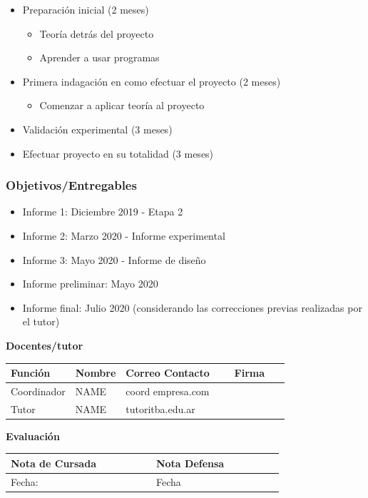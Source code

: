 \documentclass{article}
\newcommand{\reemplazo}[1]{{\color{red} #1}}
\begin{document}
\begin{itemize} \color{red} %
	\item Preparación inicial (2 meses)
	\begin{itemize}
		\item Teoría detrás del proyecto
		\item Aprender a usar programas
	\end{itemize}
	\item Primera indagación en como efectuar el proyecto (2 meses)
	\begin{itemize}
		\item Comenzar a aplicar teoría al proyecto
	\end{itemize}
	\item Validación experimental (3 meses)
	\item Efectuar proyecto en su totalidad (3 meses)
\end{itemize}

\subsubsection*{Objetivos/Entregables}
\begin{itemize} \color{red} %
	\item Informe 1: Diciembre 2019 - Etapa 2
	\item Informe 2: Marzo 2020 - Informe experimental
	\item Informe 3: Mayo 2020 - Informe de diseño
	\item Informe preliminar: Mayo 2020
	\item Informe final: Julio 2020 (considerando las correcciones previas realizadas por el tutor)
\end{itemize}

\textbf{ \sc Docentes/tutor} \par
\begin{tabular}{|l|l|l|c|} \hline
	Función & Nombre & Correo Contacto & Firma \\ \hline
	\reemplazo{Coordinador} & \reemplazo{NAME} & \reemplazo{coord \@ empresa.com} & $\qquad\qquad\qquad$ \\ [10pt] \hline
	\reemplazo{Tutor} & \reemplazo{NAME} & \reemplazo{tutor\@ itba.edu.ar} & \\ [10pt] \hline
\end{tabular} \par \vspace{.5cm}

\textbf{ \sc Evaluación} \par

\begin{tabular}{|l|l||l|l|} \hline
	Nota de Cursada & $\qquad\qquad$ & Nota Defensa & $\qquad\qquad$ \\ [7pt] \hline
	Fecha:  &   &  Fecha &\\ [5pt] \hline
\end{tabular}
\end{document}
